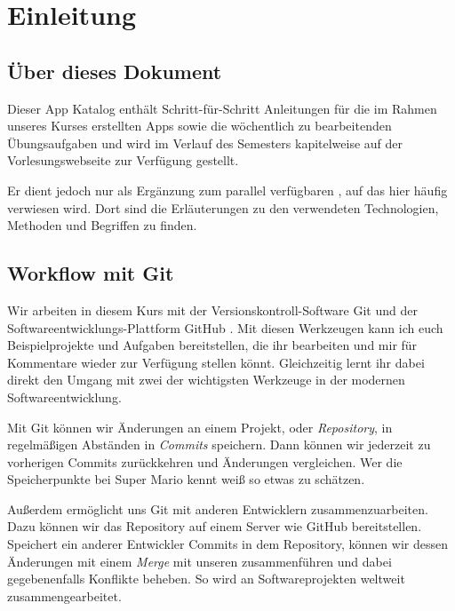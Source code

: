 \documentclass[parskip=half, final]{scrreprt}
\begin{document}
\maketitle

\tableofcontents


\chapter{Einleitung}

\section{Über dieses Dokument}

Dieser App Katalog enthält Schritt-für-Schritt Anleitungen für die im Rahmen unseres Kurses erstellten Apps sowie die wöchentlich zu bearbeitenden Übungsaufgaben und wird im Verlauf des Semesters kapitelweise auf der Vorlesungswebseite  zur Verfügung gestellt.

Er dient jedoch nur als Ergänzung zum parallel verfügbaren , auf das hier häufig verwiesen wird. Dort sind die Erläuterungen zu den verwendeten Technologien, Methoden und Begriffen zu finden.


\section{Workflow mit Git}\label{git_workflow}

Wir arbeiten in diesem Kurs mit der Versionskontroll-Software Git und der Software\-entwicklungs-Plattform GitHub . Mit diesen Werkzeugen kann ich euch Beispielprojekte und Aufgaben bereitstellen, die ihr bearbeiten und mir für Kommentare wieder zur Verfügung stellen könnt. Gleichzeitig lernt ihr dabei direkt den Umgang mit zwei der wichtigsten Werkzeuge in der modernen Softwareentwicklung.

Mit Git können wir Änderungen an einem Projekt, oder \emph{Repository}, in regelmäßigen Abständen in \emph{Commits} speichern. Dann können wir jederzeit zu vorherigen Commits zurückkehren und Änderungen vergleichen. Wer die Speicherpunkte bei Super Mario kennt weiß so etwas zu schätzen.

Außerdem ermöglicht uns Git mit anderen Entwicklern zusammenzuarbeiten. Dazu können wir das Repository auf einem Server wie GitHub bereitstellen. Speichert ein anderer Entwickler Commits in dem Repository, können wir dessen Änderungen mit einem \emph{Merge} mit unseren zusammenführen und dabei gegebenenfalls Konflikte beheben. So wird an Softwareprojekten weltweit zusammengearbeitet.
\end{document}
